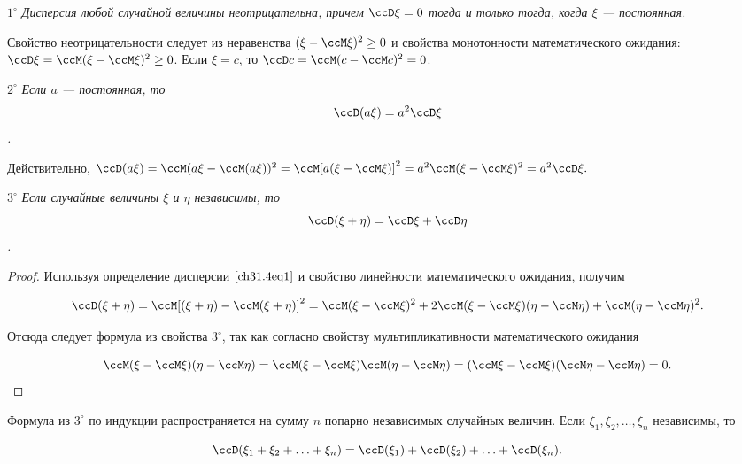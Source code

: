 $1^{\circ}$ \textit{Дисперсия любой случайной величины неотрицательна, причем $\ccD\xi = 0$ тогда и только тогда, когда $\xi$ --- постоянная. }

Свойство неотрицательности следует из неравенства $(\xi - \ccM \xi)^2 \ge 0$ и свойства монотонности математического ожидания: $\ccD \xi = \ccM (\xi - \ccM \xi)^2 \ge 0$. Если $\xi = c$, то $\ccD c = \ccM (c - \ccM c)^2 = 0$. 

$2^{\circ}$ \textit{Если $a$ --- постоянная, то $$\ccD(a\xi) = a^2 \ccD\xi$$.}

Действительно, $\ccD(a\xi) = \ccM(a\xi - \ccM (a\xi))^2 = \ccM [a (\xi - \ccM \xi)]^2 = a^2\ccM(\xi - \ccM\xi)^2 = a^2 \ccD\xi.$

$3^{\circ}$ \textit{Если случайные величины $\xi$ и $\eta$ независимы, то $$\ccD(\xi + \eta) = \ccD\xi + \ccD\eta$$.}

\begin{proof}
Используя определение дисперсии $\eqref{ch31.4eq1}$ и свойство линейности математического ожидания, получим

$$
\ccD(\xi + \eta) = \ccM[(\xi + \eta) - \ccM(\xi + \eta)]^2 = \ccM(\xi - \ccM\xi)^2 + 2\ccM(\xi - \ccM\xi)(\eta - \ccM\eta) + \ccM(\eta  - \ccM\eta)^2.
$$

Отсюда следует формула из свойства $3^{\circ}$, так как согласно свойству мультипликативности математического ожидания

$$
\ccM(\xi - \ccM\xi)(\eta - \ccM\eta) = \ccM(\xi - \ccM\xi)\ccM(\eta - \ccM\eta) = (\ccM\xi - \ccM\xi)(\ccM\eta - \ccM\eta) = 0.
$$


\end{proof}

Формула из $3^{\circ}$ по индукции распространяется на сумму $n$ попарно независимых случайных величин. Если $\xi_1,\xi_2, \ldots, \xi_n$ независимы, то 

$$
\ccD(\xi_1 + \xi_2 + \ldots + \xi_n) = \ccD(\xi_1) + \ccD(\xi_2) + \ldots + \ccD(\xi_n).
$$
